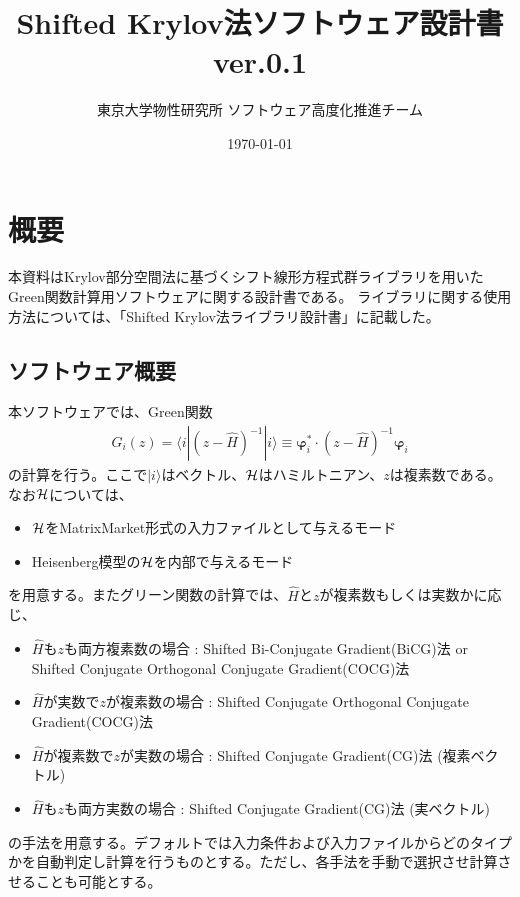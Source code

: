 \documentclass[12pt,titlepage]{jarticle}
\begin{document}
%
%
\title{Shifted Krylov法ソフトウェア設計書 ver.0.1}
\author{東京大学物性研究所 ソフトウェア高度化推進チーム}
\date{\today}
\maketitle
%

%
%
\tableofcontents

\newpage
\section{概要}

本資料はKrylov部分空間法に基づくシフト線形方程式群ライブラリを用いたGreen関数計算用ソフトウェアに関する設計書である。
ライブラリに関する使用方法については、「Shifted Krylov法ライブラリ設計書」に記載した。

\subsection{ソフトウェア概要}
本ソフトウェアでは、Green関数
\begin{align}
  G_{i}(z) = \langle i | (z-{\hat H})^{-1}| i \rangle \equiv 
  {\boldsymbol \varphi}_i^{*} \cdot (z-{\hat H})^{-1} {\boldsymbol \varphi}_i
\end{align}
の計算を行う。ここで$| i \rangle $はベクトル、${\cal H}$はハミルトニアン、$z$は複素数である。\\
なお${\cal H}$については、
\begin{itemize}
\item{${\cal H}$をMatrixMarket形式の入力ファイルとして与えるモード}
\item{Heisenberg模型の${\cal H}$を内部で与えるモード}
\end{itemize}
を用意する。またグリーン関数の計算では、${\hat H}$と$z$が複素数もしくは実数かに応じ、
\begin{itemize}
\item ${\hat H}$も$z$も両方複素数の場合 : Shifted Bi-Conjugate Gradient(BiCG)法 or Shifted Conjugate Orthogonal Conjugate Gradient(COCG)法 
\item ${\hat H}$が実数で$z$が複素数の場合 : Shifted Conjugate Orthogonal Conjugate Gradient(COCG)法 
\item ${\hat H}$が複素数で$z$が実数の場合 : Shifted Conjugate Gradient(CG)法 (複素ベクトル)
\item ${\hat H}$も$z$も両方実数の場合 : Shifted Conjugate Gradient(CG)法 (実ベクトル)
\end{itemize}
の手法を用意する。デフォルトでは入力条件および入力ファイルからどのタイプかを自動判定し計算を行うものとする。ただし、各手法を手動で選択させ計算させることも可能とする。
\end{document}
